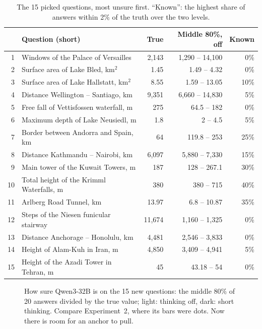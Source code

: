 \documentclass[11pt,a4paper]{article}
\begin{document}
\begin{table}[ht]
\centering\small
\begin{tabular}{@{}rlrrr@{}}
\toprule
& Question (short) & True & Middle 80\%, off & Known \\
\midrule
1 & Windows of the Palace of Versailles & 2,143 & 1,290 -- 14,100 & 0\% \\
2 & Surface area of Lake Bled, km$^2$ & 1.45 & 1.49 -- 4.32 & 0\% \\
3 & Surface area of Lake Hallstatt, km$^2$ & 8.55 & 1.59 -- 13.05 & 10\% \\
4 & Distance Wellington -- Santiago, km & 9,351 & 6,660 -- 14,830 & 5\% \\
5 & Free fall of Vettisfossen waterfall, m & 275 & 64.5 -- 182 & 0\% \\
6 & Maximum depth of Lake Neusiedl, m & 1.8 & 2 -- 4.5 & 5\% \\
7 & Border between Andorra and Spain, km & 64 & 119.8 -- 253 & 25\% \\
8 & Distance Kathmandu -- Nairobi, km & 6,097 & 5,880 -- 7,330 & 15\% \\
9 & Main tower of the Kuwait Towers, m & 187 & 128 -- 267.1 & 30\% \\
10 & Total height of the Krimml Waterfalls, m & 380 & 380 -- 715 & 40\% \\
11 & Arlberg Road Tunnel, km & 13.97 & 6.8 -- 10.87 & 35\% \\
12 & Steps of the Niesen funicular stairway & 11,674 & 1,160 -- 1,325 & 0\% \\
13 & Distance Anchorage -- Honolulu, km & 4,481 & 2,546 -- 3,833 & 0\% \\
14 & Height of Alam-Kuh in Iran, m & 4,850 & 3,409 -- 4,941 & 5\% \\
15 & Height of the Azadi Tower in Tehran, m & 45 & 43.18 -- 54 & 0\% \\
\bottomrule
\end{tabular}
\caption{The 15 picked questions, most unsure first. \enquote{Known}: the highest share of answers within 2\% of the truth over the two levels.}
\end{table}

\begin{figure}[ht]
\centering{}
\caption{How sure Qwen3-32B is on the 15 new questions: the middle 80\% of 20 answers divided by the true value; light: thinking off, dark: short thinking. Compare Experiment~2, where its bars were dots. Now there is room for an anchor to pull.}
\end{figure}
\end{document}
